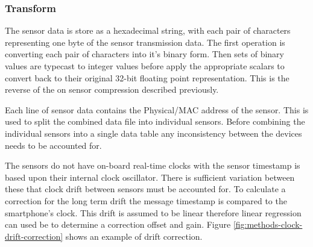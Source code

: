 \subsubsection{Transform}
The sensor data is store as a hexadecimal string, with each pair of characters representing one byte of the sensor transmission data. The first operation is converting each pair of characters into it's binary form. Then sets of binary values are typecast to integer values before apply the appropriate scalars to convert back to their original 32-bit floating point representation. This is the reverse of the on sensor compression described previously.

Each line of sensor data contains the Physical/MAC address of the sensor. This is used to split the combined data file into individual sensors. Before combining the individual sensors into a single data table any inconsistency between the devices needs to be accounted for.

The sensors do not have on-board real-time clocks with the sensor timestamp is based upon their internal clock oscillator. There is sufficient variation between these that clock drift between sensors must be accounted for. To calculate a correction for the long term drift the message timestamp is compared to the smartphone's clock. This drift is assumed to be linear therefore linear regression can used be to determine a correction offset and gain. Figure \ref{fig:methods-clock-drift-correction} shows an example of drift correction.

